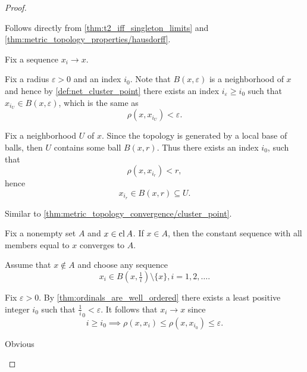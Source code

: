 \begin{proof}
  \begin{description}
     Follows directly from \cref{thm:t2_iff_singleton_limits} and \cref{thm:metric_topology_properties/hausdorff}.

     Fix a sequence \( x_i \to x \).

    \begin{description}
      \Implies Fix a radius \( \varepsilon > 0 \) and an index \( i_0 \). Note that \( B(x, \varepsilon) \) is a neighborhood of \( x \) and hence by \cref{def:net_cluster_point} there exists an index \( i_\varepsilon \geq i_0 \) such that \( x_{i_U} \in B(x, \varepsilon) \), which is the same as
      \begin{equation*}
        \rho(x, x_{i_U}) < \varepsilon.
      \end{equation*}

      \ImpliedBy Fix a neighborhood \( U \) of \( x \). Since the topology is generated by a local base of balls, then \( U \) contains some ball \( B(x, r) \). Thus there exists an index \( i_0 \), such that
      \begin{equation*}
        \rho(x, x_{i_r}) < r,
      \end{equation*}
      hence
      \begin{equation*}
        x_{i_r} \in B(x, r) \subseteq U.
      \end{equation*}
    \end{description}

     Similar to \ref{thm:metric_topology_convergence/cluster_point}.

    \begin{description}
      \Implies Fix a nonempty set \( A \) and \( x \in \operatorname{cl} A \). If \( x \in A \), then the constant sequence with all members equal to \( x \) converges to \( A \).

      Assume that \( x \not\in A \) and choose any sequence\AOC
      \begin{equation*}
        x_i \in B(x, \tfrac 1 i) \setminus \{ x \}, i = 1, 2, \ldots.
      \end{equation*}

      Fix \( \varepsilon > 0 \). By \cref{thm:ordinals_are_well_ordered} there exists a least positive integer \( i_0 \) such that \( \tfrac 1 i_0 < \varepsilon \). It follows that \( x_i \to x \) since
      \begin{equation*}
        i \geq i_0 \implies \rho(x, x_i) \leq \rho(x, x_{i_0}) \leq \varepsilon.
      \end{equation*}

      \ImpliedBy Obvious
    \end{description}
  \end{description}
\end{proof}

